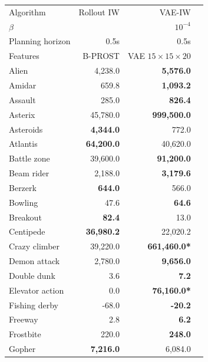 \begin{table}[ht]
\begin{center}
\begin{small}
\begin{tabular}{lrrl}
\toprule
Algorithm& Rollout IW & VAE-IW \\
$\beta$ &  & $10^{-4}$\\
Planning horizon& 0.5s & 0.5s  \\
Features & B-PROST & VAE $15 \times 15 \times 20$\\

\midrule

Alien           & 4,238.0           & \textbf{5,576.0}   \\
Amidar          & 659.8             & \textbf{1,093.2}   \\
Assault         & 285.0             & \textbf{826.4}     \\
Asterix         & 45,780.0          & \textbf{999,500.0} \\
Asteroids       & \textbf{4,344.0}  & 772.0              \\
Atlantis        & \textbf{64,200.0} & 40,620.0           \\
Battle zone     & 39,600.0          & \textbf{91,200.0}  \\
Beam rider      & 2,188.0           & \textbf{3,179.6}   \\
Berzerk         & \textbf{644.0}    & 566.0              \\
Bowling         & 47.6              & \textbf{64.6}      \\
Breakout        & \textbf{82.4}     & 13.0               \\
Centipede       & \textbf{36,980.2} & 22,020.2           \\
Crazy climber   & 39,220.0          & \textbf{661,460.0*} \\
Demon attack    & 2,780.0           & \textbf{9,656.0}   \\
Double dunk     & 3.6               & \textbf{7.2}       \\
Elevator action & 0.0               & \textbf{76,160.0*}  \\
Fishing derby   & -68.0             & \textbf{-20.2}     \\
Freeway         & 2.8               & \textbf{6.2}       \\
Frostbite       & 220.0             & \textbf{248.0}     \\
Gopher          & \textbf{7,216.0}  & 6,084.0            \\

\end{tabular}
\end{small}
\end{center}
\end{table}
